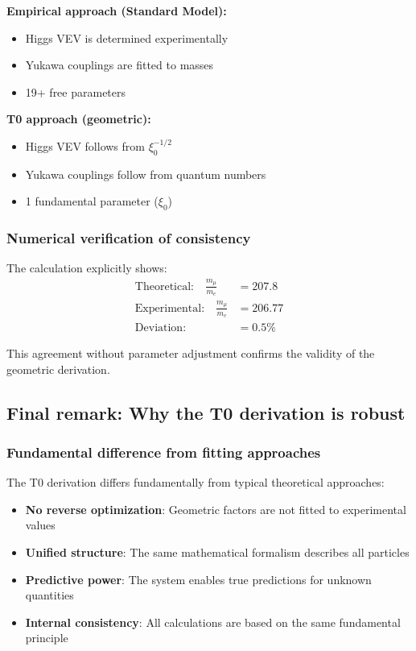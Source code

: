 \documentclass[12pt,a4paper]{report}
\begin{document}
\textbf{Empirical approach (Standard Model):}
\begin{itemize}
	\item Higgs VEV is determined experimentally
	\item Yukawa couplings are fitted to masses
	\item 19+ free parameters
\end{itemize}

\textbf{T0 approach (geometric):}
\begin{itemize}
	\item Higgs VEV follows from $\xi_0^{-1/2}$
	\item Yukawa couplings follow from quantum numbers
	\item 1 fundamental parameter ($\xi_0$)
\end{itemize}

\subsubsection{Numerical verification of consistency}

The calculation explicitly shows:
\begin{align}
	\text{Theoretical:} \quad \frac{m_\mu}{m_e} &= 207.8\\
	\text{Experimental:} \quad \frac{m_\mu}{m_e} &= 206.77\\
	\text{Deviation:} \quad &= 0.5\%
\end{align}

This agreement without parameter adjustment confirms the validity of the geometric derivation.

\subsection{Final remark: Why the T0 derivation is robust}

\subsubsection{Fundamental difference from fitting approaches}

The T0 derivation differs fundamentally from typical theoretical approaches:

\begin{itemize}
	\item \textbf{No reverse optimization}: Geometric factors are not fitted to experimental values
	\item \textbf{Unified structure}: The same mathematical formalism describes all particles
	\item \textbf{Predictive power}: The system enables true predictions for unknown quantities
	\item \textbf{Internal consistency}: All calculations are based on the same fundamental principle
\end{itemize}
\end{document}
